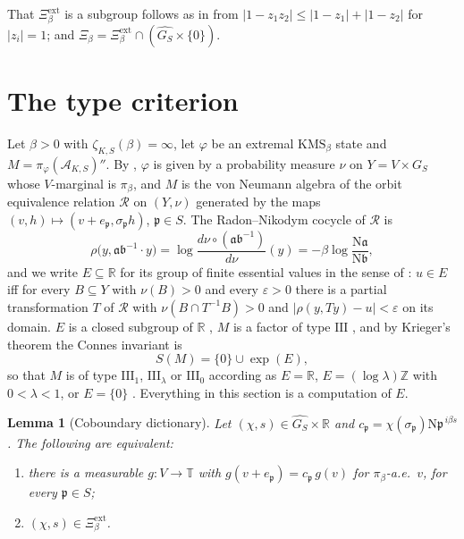 \documentclass[11pt]{amsart}
\numberwithin{equation}{section}
\newtheorem{lemma}[theorem]{Lemma}
\theoremstyle{definition}
\theoremstyle{remark}
\newcommand{\Z}{\mathbb{Z}}
\newcommand{\R}{\mathbb{R}}
\newcommand{\T}{\mathbb{T}}
\newcommand{\cA}{\mathcal{A}}
\newcommand{\cR}{\mathcal{R}}
\newcommand{\pp}{\mathfrak{p}}
\newcommand{\aaa}{\mathfrak{a}}
\newcommand{\bb}{\mathfrak{b}}
\newcommand{\Ns}{\mathrm{N}}
\newcommand{\Xiext}{\Xi^{\mathrm{ext}}_\beta}
\begin{document}
That $\Xiext$ is a subgroup follows as in \cite[Lem.~3.5]{Main} from
$|1-z_1z_2|\le|1-z_1|+|1-z_2|$ for $|z_i|=1$; and $\Xi_\beta=\Xiext\cap(\widehat{G_S}\times\{0\})$.

\section{The type criterion}\label{sec:type}

Let $\beta>0$ with $\zeta_{K,S}(\beta)=\infty$, let $\varphi$ be an extremal
$\mathrm{KMS}_\beta$ state and $M=\pi_\varphi(\cA_{K,S})''$. By \cite[Prop.~2.8 and
Lem.~2.10]{Main}, $\varphi$ is given by a probability measure $\nu$ on $Y=V\times G_S$ whose
$V$-marginal is $\pi_\beta$, and $M$ is the von Neumann algebra of the orbit equivalence
relation $\cR$ on $(Y,\nu)$ generated by the maps $(v,h)\mapsto(v+e_\pp,\sigma_\pp h)$,
$\pp\in S$. The Radon--Nikodym cocycle of $\cR$ is
\begin{equation}\label{eq:rho}
\rho\bigl(y,\aaa\bb^{-1}\cdot y\bigr)=\log\frac{d\nu\circ(\aaa\bb^{-1})}{d\nu}(y)
=-\beta\log\frac{\Ns\aaa}{\Ns\bb},
\end{equation}
and we write $E\subseteq\R$ for its group of finite essential values in the sense of
\cite{Schmidt}: $u\in E$ iff for every $B\subseteq Y$ with $\nu(B)>0$ and every
$\varepsilon>0$ there is a partial transformation $T$ of $\cR$ with
$\nu(B\cap T^{-1}B)>0$ and $|\rho(y,Ty)-u|<\varepsilon$ on its domain. $E$ is a closed
subgroup of $\R$ \cite{Schmidt}, $M$ is a factor of type $\mathrm{III}$
\cite[Prop.~6.1]{Main}, and by Krieger's theorem \cite{Krieger} the Connes invariant is
\begin{equation}\label{eq:SM}
S(M)=\{0\}\cup\exp(E),
\end{equation}
so that $M$ is of type $\mathrm{III}_1$, $\mathrm{III}_\lambda$ or $\mathrm{III}_0$
according as $E=\R$, $E=(\log\lambda)\Z$ with $0<\lambda<1$, or $E=\{0\}$ \cite{Connes73}.
Everything in this section is a computation of $E$.

\begin{lemma}[Coboundary dictionary]\label{lem:dict}
Let $(\chi,s)\in\widehat{G_S}\times\R$ and $c_\pp=\chi(\sigma_\pp)\Ns\pp^{\,i\beta s}$. The
following are equivalent:
\begin{enumerate}
\item there is a measurable $g:V\to\T$ with $g(v+e_\pp)=c_\pp\,g(v)$ for $\pi_\beta$-a.e.\
$v$, for every $\pp\in S$;
\item $(\chi,s)\in\Xiext$.
\end{enumerate}
\end{lemma}
\end{document}
